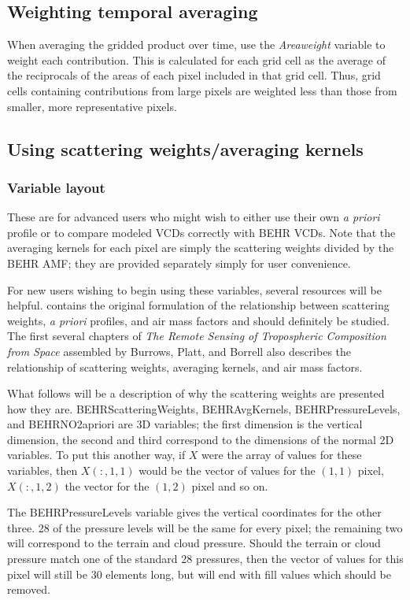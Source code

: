 \documentclass[12pt]{article}
\begin{document}
	\subsection{Weighting temporal averaging}
	When averaging the gridded product over time, use the \emph{Areaweight} variable to weight each contribution.  This is calculated for each grid cell as the average of the reciprocals of the areas of each pixel included in that grid cell.  Thus, grid cells containing contributions from large pixels are weighted less than those from smaller, more representative pixels.
	
	\subsection{Using scattering weights/averaging kernels}
	\subsubsection{Variable layout}
	These are for advanced users who might wish to either use their own \emph{a priori}  profile or to compare modeled  VCDs correctly with BEHR VCDs.  Note that the averaging kernels for each pixel are simply the scattering weights divided by the BEHR AMF; they are provided separately simply for user convenience.
	
	For new users wishing to begin using these variables, several resources will be helpful. \citet{palmer2001} contains the original formulation of the relationship between scattering weights, \emph{a priori}  profiles, and air mass factors and should definitely be studied. The first several chapters of \emph{The Remote Sensing of Tropospheric Composition from Space} assembled by Burrows, Platt, and Borrell \citep{burrows-platt} also describes the relationship of scattering weights, averaging kernels, and air mass factors.
	
	What follows will be a description of why the scattering weights are presented how they are.  BEHRScatteringWeights, BEHRAvgKernels, BEHRPressureLevels, and BEHRNO2apriori are 3D variables; the first dimension is the vertical dimension, the second and third correspond to the dimensions of the normal 2D variables. To put this another way, if $X$ were the array of values for these variables, then $X(:,1,1)$ would be the vector of values for the $(1,1)$ pixel, $X(:,1,2)$ the vector for the $(1,2)$ pixel and so on.
	
	The BEHRPressureLevels variable gives the vertical coordinates for the other three.  28 of the pressure levels will be the same for every pixel; the remaining two will correspond to the terrain and cloud pressure. Should the terrain or cloud pressure match one of the standard 28 pressures, then the vector of values for this pixel will still be 30 elements long, but will end with fill values which should be removed.
	
\end{document}
